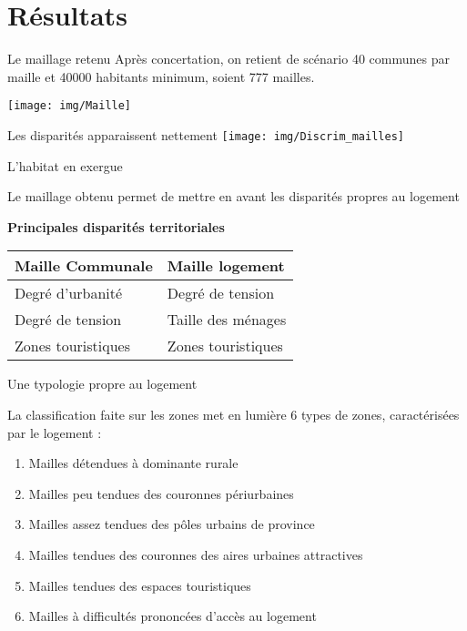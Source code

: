 \documentclass[11pt]{beamer}
\begin{document}
\section{Résultats}

\begin{frame}{Le maillage retenu}
Après concertation, on retient de scénario 40 communes par maille et 40000 habitants minimum, soient 777 mailles.
\begin{center}
\texttt{[image: img/Maille]}
\end{center}
\end{frame}

\begin{frame}{Les disparités apparaissent nettement}
\texttt{[image: img/Discrim\_mailles]}
\end{frame}

\begin{frame}{L'habitat en exergue}

Le maillage obtenu permet de mettre en avant les disparités propres au logement

\begin{center}
\textbf{Principales disparités territoriales} \\
\vspace{.3cm}

\begin{tabular}{p{4cm} | p{4cm}}
\hline
Maille Communale & Maille logement \\
\hline
Degré d'urbanité & Degré de tension \\
Degré de tension & Taille des ménages \\
Zones touristiques & Zones touristiques \\
\hline

\end{tabular}
\end{center}
\end{frame}

\begin{frame}{Une typologie propre au logement}

La classification faite sur les zones met en lumière 6 types de zones, caractérisées par le logement :
\vspace{.2cm}
\begin{enumerate}
\item Mailles détendues à dominante rurale
\item Mailles peu tendues des couronnes périurbaines
\item Mailles assez tendues des pôles urbains de province
\item Mailles tendues des couronnes des aires urbaines attractives
\item Mailles tendues des espaces touristiques
\item Mailles à difficultés prononcées d'accès au logement
\end{enumerate}
\end{frame}
\end{document}
